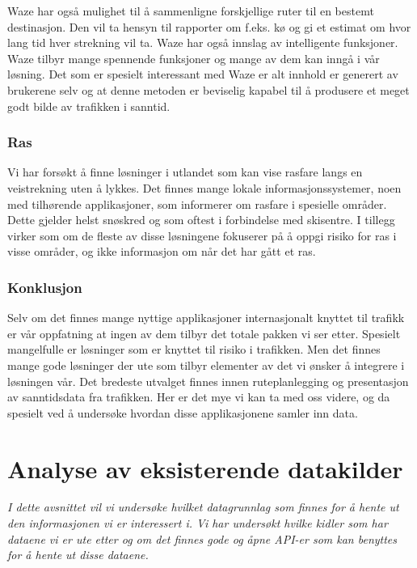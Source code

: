 \documentclass[a4paper,norsk,oneside]{book}
\begin{document}
Waze har også mulighet til å sammenligne forskjellige ruter til en bestemt destinasjon. Den vil ta hensyn til rapporter om f.eks. kø og gi et estimat om hvor lang tid hver strekning vil ta. Waze har også innslag av intelligente funksjoner. Waze tilbyr mange spennende funksjoner og mange av dem kan inngå i vår løsning. Det som er spesielt interessant med Waze er alt innhold er generert av brukerene selv og at denne metoden er beviselig kapabel til å produsere et meget godt bilde av trafikken i sanntid.\cite{waze1} \cite{waze2}

\subsection{Ras}
Vi har forsøkt å finne løsninger i utlandet som kan vise rasfare langs en veistrekning uten å lykkes. Det finnes mange lokale informasjonssystemer, noen med tilhørende applikasjoner, som informerer om rasfare i spesielle områder. Dette gjelder helst snøskred og som oftest i forbindelse med skisentre. I tillegg virker som om de fleste av disse løsningene fokuserer på å oppgi risiko for ras i visse områder, og ikke informasjon om når det har gått et ras.\cite{ras1}

\subsection{Konklusjon}
Selv om det finnes mange nyttige applikasjoner internasjonalt knyttet til trafikk er vår oppfatning at ingen av dem tilbyr det totale pakken vi ser etter. Spesielt mangelfulle er løsninger som er knyttet til risiko i trafikken. Men det finnes mange gode løsninger der ute som tilbyr elementer av det vi ønsker å integrere i løsningen vår. Det bredeste utvalget finnes innen ruteplanlegging og presentasjon av sanntidsdata fra trafikken. Her er det mye vi kan ta med oss videre, og da spesielt ved å undersøke hvordan disse applikasjonene samler inn data.

\chapter{Analyse av eksisterende datakilder}
\label{sec:datakilderl}
{ \it I dette avsnittet vil vi undersøke hvilket datagrunnlag som finnes for å hente ut den informasjonen vi er interessert i. Vi har undersøkt hvilke kidler som har dataene vi er ute etter og om det finnes gode og åpne API-er som kan benyttes for å hente ut disse dataene. } 
\end{document}

